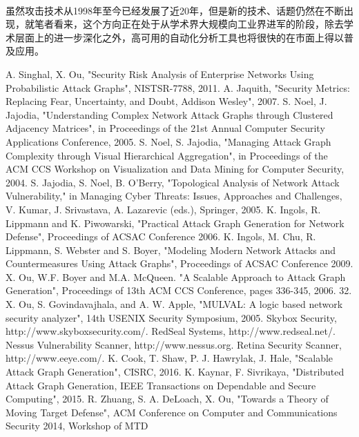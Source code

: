 \documentclass[12pt,a4paper]{article}
\begin{document}
\paragraph{}
虽然攻击技术从1998年至今已经发展了近20年，但是新的技术、话题仍然在不断出现，就笔者看来，这个方向正在处于从学术界大规模向工业界进军的阶段，除去学术层面上的进一步深化之外，高可用的自动化分析工具也将很快的在市面上得以普及应用。

\renewcommand{\refname}{\centerline{参考文献}}
\begin{thebibliography}{}
 A. Singhal, X. Ou, "Security Risk Analysis of Enterprise Networks Using Probabilistic Attack Graphs", NISTSR-7788, 2011.
 A. Jaquith, "Security Metrics: Replacing Fear, Uncertainty, and Doubt, Addison Wesley", 2007.
 S. Noel, J. Jajodia, "Understanding Complex Network Attack Graphs through Clustered Adjacency Matrices", in Proceedings of the 21st Annual Computer Security Applications Conference, 2005.
 S. Noel, S. Jajodia, "Managing Attack Graph Complexity through Visual Hierarchical Aggregation", in Proceedings of the ACM CCS Workshop on Visualization and Data Mining for Computer Security, 2004.
 S. Jajodia, S. Noel, B. O’Berry, "Topological Analysis of Network Attack Vulnerability," in Managing Cyber Threats: Issues, Approaches and Challenges, V. Kumar, J. Srivastava, A. Lazarevic (eds.), Springer, 2005.
 K. Ingols, R. Lippmann and K. Piwowarski, "Practical Attack Graph Generation for Network Defense", Proceedings of ACSAC Conference 2006.
 K. Ingols, M. Chu, R. Lippmann, S. Webster and S. Boyer, "Modeling Modern Network Attacks and Countermeasures Using Attack Graphs", Proceedings of ACSAC Conference 2009.
 X. Ou, W.F. Boyer and M.A. McQueen. "A Scalable Approach to Attack Graph Generation", Proceedings of 13th ACM CCS Conference, pages 336-345, 2006.
 32. X. Ou, S. Govindavajhala, and A. W. Apple, "MULVAL: A logic based network security analyzer", 14th USENIX Security Symposium, 2005.
 Skybox Security, http://www.skyboxsecurity.com/.
 RedSeal Systems, http://www.redseal.net/.
 Nessus Vulnerability Scanner, http://www.nessus.org.
 Retina Security Scanner, http://www.eeye.com/.
 K. Cook, T. Shaw, P. J. Hawrylak, J. Hale, "Scalable Attack Graph Generation", CISRC, 2016.
 K. Kaynar, F. Sivrikaya, "Distributed Attack Graph Generation, IEEE Transactions on Dependable and Secure Computing", 2015.
 R. Zhuang, S. A. DeLoach, X. Ou, "Towards a Theory of Moving Target Defense", ACM Conference on Computer and Communications Security 2014, Workshop of MTD

\end{thebibliography}
\end{document}
